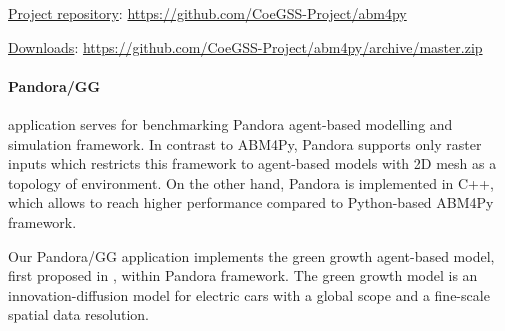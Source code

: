 \iffalse
Two types of entities are created: location, as part of a spatial domain, and acting agents that follow some decision rule and interact with each other. The agents are distributed uniformly on a 2D area. The spatial proximity increases the likelihood of agents to get connected. Each agent has only one property "A", which is initiated as a random floating point number between 0 and 1 and is connected with other m agents.
At each step the agents perform the same action pattern. If the average of all values "A" of all connected agents is less than 0.5, the agents draw a new property "A" for themselves. It is to observe if the global average of "A" is affected by the decision rule and, if so, how.
This minimal example therefore contains a computational component per agent (action) and a communication component. The property "A" is synchronised via ghost agents between the processes.
Depending on whether the focus is on weak or strong scaling, the example setup can adapt to the number of used processes.
\fi

\underline{Project repository}: \url{https://github.com/CoeGSS-Project/abm4py}

\underline{Downloads}: \url{https://github.com/CoeGSS-Project/abm4py/archive/master.zip}

\iffalse
\underline{Use case description}

The application is purely python-based code that requires several modules among which the most important is \textit{h5py} (pythonic interface to the HDF5 binary data format). It additionally requires \textit{class\_auxiliary.pyc,  class\_graph.pyc} and \textit{lib\_gcfabm.pyc} files containing the application's byte code. Additionally, the python environment has to be equipped with additional modules preinstalled such as \textit{numpy, mpi4py, matplotlib, pandas}, etc.
\fi

\paragraph{Pandora/GG} application serves for benchmarking \textsf{Pandora} agent-based modelling and simulation framework.
In contrast to \textsf{ABM4Py}, \textsf{Pandora} supports only raster inputs
which restricts this framework to agent-based models with 2D mesh as a topology of environment.
On the other hand, \textsf{Pandora} is implemented in C++,
which allows to reach higher performance compared to Python-based \textsf{ABM4Py} framework.

Our Pandora/GG application implements the green growth agent-based model, first proposed in \cite{2017:gg_pilot}, within \textsf{Pandora} framework.
The green growth model is an innovation-diffusion model for electric cars with a global scope and a fine-scale spatial data resolution.

